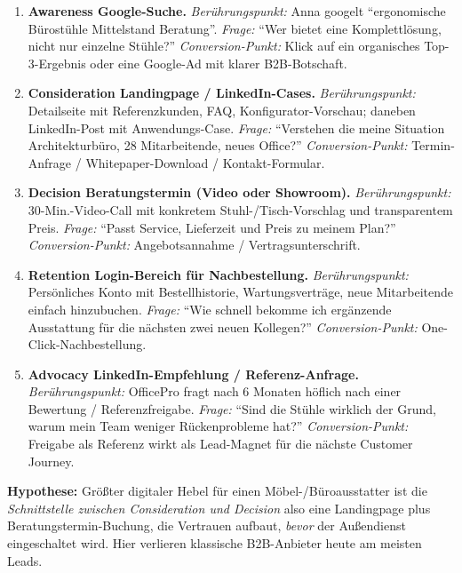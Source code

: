 \documentclass[11pt,a4paper,oneside]{article}
\begin{document}
\begin{loesungbox}
\begin{enumerate}
  \item \textbf{Awareness \textendash{} Google-Suche.} \emph{Berührungspunkt:} Anna googelt ``ergonomische Bürostühle Mittelstand Beratung''. \emph{Frage:} ``Wer bietet eine Komplettlösung, nicht nur einzelne Stühle?'' \emph{Conversion-Punkt:} Klick auf ein organisches Top-3-Ergebnis oder eine Google-Ad mit klarer B2B-Botschaft.
  \item \textbf{Consideration \textendash{} Landingpage / LinkedIn-Cases.} \emph{Berührungspunkt:} Detailseite mit Referenzkunden, FAQ, Konfigurator-Vorschau; daneben LinkedIn-Post mit Anwendungs-Case. \emph{Frage:} ``Verstehen die meine Situation \textendash{} Architekturbüro, 28 Mitarbeitende, neues Office?'' \emph{Conversion-Punkt:} Termin-Anfrage / Whitepaper-Download / Kontakt-Formular.
  \item \textbf{Decision \textendash{} Beratungstermin (Video oder Showroom).} \emph{Berührungspunkt:} 30-Min.-Video-Call mit konkretem Stuhl-/Tisch-Vorschlag und transparentem Preis. \emph{Frage:} ``Passt Service, Lieferzeit und Preis zu meinem Plan?'' \emph{Conversion-Punkt:} Angebotsannahme / Vertragsunterschrift.
  \item \textbf{Retention \textendash{} Login-Bereich für Nachbestellung.} \emph{Berührungspunkt:} Persönliches Konto mit Bestellhistorie, Wartungsverträge, neue Mitarbeitende einfach hinzubuchen. \emph{Frage:} ``Wie schnell bekomme ich ergänzende Ausstattung für die nächsten zwei neuen Kollegen?'' \emph{Conversion-Punkt:} One-Click-Nachbestellung.
  \item \textbf{Advocacy \textendash{} LinkedIn-Empfehlung / Referenz-Anfrage.} \emph{Berührungspunkt:} OfficePro fragt nach 6 Monaten höflich nach einer Bewertung / Referenzfreigabe. \emph{Frage:} ``Sind die Stühle wirklich der Grund, warum mein Team weniger Rückenprobleme hat?'' \emph{Conversion-Punkt:} Freigabe als Referenz \textendash{} wirkt als Lead-Magnet für die nächste Customer Journey.
\end{enumerate}

\textbf{Hypothese:} Größter digitaler Hebel für einen Möbel-/Büroausstatter ist die \emph{Schnittstelle zwischen Consideration und Decision} \textendash{} also eine Landingpage plus Beratungstermin-Buchung, die Vertrauen aufbaut, \emph{bevor} der Außendienst eingeschaltet wird. Hier verlieren klassische B2B-Anbieter heute am meisten Leads.
\end{loesungbox}

\clearpage
\end{document}
